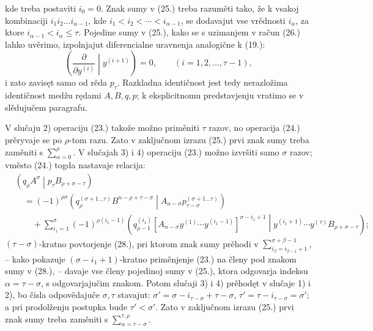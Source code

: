 \documentclass[11pt]{article}
\newcommand{\pair}[2]{\left(#1\middle|#2\right)}
\begin{document}
kde treba postaviti $i_0=0$. Znak sumy v (25.) treba razuměti tako, že k vsakoj kombinaciji $i_1i_2\ldots i_{\alpha-1}$, kde $i_1<i_2<\cdots<i_{\alpha-1}$, se dodavajut vse vrědnosti $i_\alpha$, za ktore $i_{\alpha-1}<i_\alpha\le\tau$. Pojedine sumy v (25.), kako se s uzimanjem v račun (26.) lahko uvěrimo, izpolnjajut diferencialne uravnenja analogične k (19.):
\begin{equation}
 \left(\frac{\partial}{\partial y^{(i)}}\middle|y^{(i+1)}\right)=0,
 \qquad (i=1,2,\ldots,\tau-1),
\tag{27}
\end{equation}
i zato zavisęt samo od rěda $p_\tau$. Razkladna identičnost jest tedy nerazložima identičnost medžu rędami $A,B,q,p$; k eksplicitnomu predstavjenju vratimo se v slědujučem paragrafu.

V slučaju 2) operaciju (23.) takože možno priměniti $\tau$ razov, no operacija (24.) prěryvaje se po $\rho$-tom razu. Zato v zaključnom izrazu (25.) prvi znak sumy treba zaměniti s $\sum_{\alpha=0}^{\rho}$. V slučajah 3) i 4) operaciju (23.) možno izvršiti samo $\sigma$ razov; vměsto (24.) togda nastavaje relacija:
\begin{equation}
\begin{aligned}
&\pair{q_\rho A^\sigma}{p_\tau B_{\rho+\sigma-\tau}}\\
&\quad=(-1)^{\rho\sigma}
\pair{q_\rho^{(\sigma+1\ldots\tau)}B^{n-\rho+\tau-\sigma}}
{A_{n-\sigma}p_{\tau-\sigma}^{(\sigma+1\ldots\tau)}}\\
&\qquad+\sum_{i_1=1}^{\sigma}(-1)^{\rho(i_1-1)}
\pair{q_{\rho-1}^{(i_1)}
[A_{n-\sigma}y^{(1)}\cdots y^{(i_1-1)}]^{\sigma-i_1+1}}
{y^{(i_1+1)}\cdots y^{(\tau)}B_{\rho+\sigma-\tau}};
\end{aligned}
\tag{28}
\end{equation}
$(\tau-\sigma)$-kratno povtorjenje (28.), pri ktorom znak sumy prěhodi v $\sum_{i_\beta=i_{\beta-1}+1}^{\sigma+\beta-1}$, -- kako pokazuje $(\sigma-i_1+1)$-kratno priměnjenje (23.) na členy pod znakom sumy v (28.), -- davaje vse členy pojedinoj sumy v (25.), ktora odgovarja indeksu $\alpha=\tau-\sigma$, s odgovarjajučim znakom. Potom slučaji 3) i 4) prěhodęt v slučaje 1) i 2), bo čisla odpovědajuče $\sigma,\tau$ stavajut: $\sigma'=\sigma-i_{\tau-\sigma}+\tau-\sigma$, $\tau'=\tau-i_{\tau-\sigma}=\sigma'$; a pri prodolženju postupka bude $\tau'<\sigma'$. Zato v zaključnom izrazu (25.) prvi znak sumy treba zaměniti s $\sum_{\alpha=\tau-\sigma}^{\tau,\rho}$.
\end{document}
